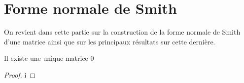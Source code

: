 \appendix

\section{Forme normale de Smith}

On revient dans cette partie sur la construction de la forme normale de Smith d'une matrice ainsi que sur les principaux résultats sur cette dernière. 

\begin{propriete}
	Il existe une unique matrice $0$ 


\end{propriete}

\begin{proof}
i
\end{proof}
